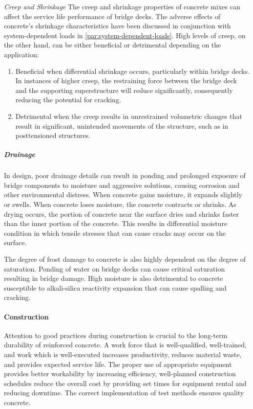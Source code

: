 \emph{Creep and Shrinkage} The creep and shrinkage properties of concrete mixes can affect the service life performance of bridge decks. The adverse effects of concrete’s shrinkage characteristics have been discussed in conjunction with system-dependent loads in \cref{par:system-dependent-loads}. High levels of creep, on the other hand, can be either beneficial or detrimental depending on the application: 
\begin{enumerate}
  \item Beneficial when differential shrinkage occurs, particularly within bridge decks. In instances of higher creep, the restraining force between the bridge deck and the supporting superstructure will reduce significantly, consequently reducing the potential for cracking. 
  \item Detrimental when the creep results in unrestrained volumetric changes that result in significant, unintended movements of the structure, such as in posttensioned structures.
\end{enumerate}


\subparagraph{Drainage}

In design, poor drainage details can result in ponding and prolonged exposure of bridge components to moisture and aggressive solutions, causing corrosion and other environmental distress. When concrete gains moisture, it expands slightly or swells. When concrete loses moisture, the concrete contracts or shrinks. As drying occurs, the portion of concrete near the surface dries and shrinks faster than the inner portion of the concrete. This results in differential moisture condition in which tensile stresses that can cause cracks may occur on the surface.

The degree of frost damage to concrete is also highly dependent on the degree of saturation. Ponding of water on bridge decks can cause critical saturation resulting in bridge damage. High moisture is also detrimental to concrete susceptible to alkali-silica reactivity expansion that can cause spalling and cracking.

\paragraph{Construction}
Attention to good practices during construction is crucial to the long-term durability of reinforced concrete. A work force that is well-qualified, well-trained, and work which is well-executed increases productivity, reduces material waste, and provides expected service life. The proper use of appropriate equipment provides better workability by increasing efficiency, well-planned construction schedules reduce the overall cost by providing set times for equipment rental and reducing downtime. The correct implementation of test methods ensures quality concrete.

